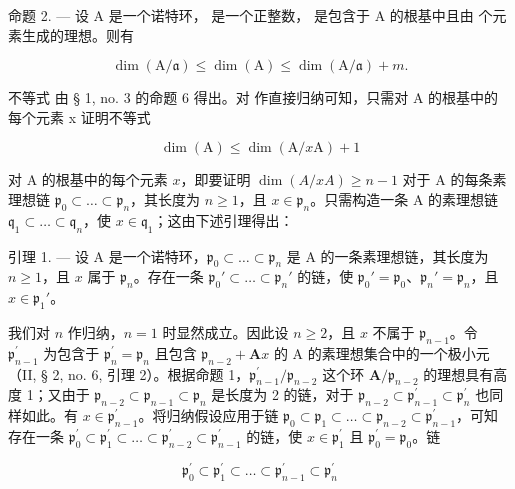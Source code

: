 命题 2. --- 设 A 是一个诺特环，  是一个正整数，  是包含于 A 的根基中且由  个元素生成的理想。则有

\[
\dim (\mathrm{A} / \mathfrak {a}) \leqslant \dim (\mathrm{A}) \leqslant \dim (\mathrm{A} / \mathfrak {a}) + m.\tag{4}
\]

不等式  由 § 1, no. 3 的命题 6 得出。对  作直接归纳可知，只需对 A 的根基中的每个元素 x 证明不等式

\[
\dim (\mathrm{A}) \leqslant \dim (\mathrm{A} / x \mathrm{A}) + 1\tag{5}
\]

对 A 的根基中的每个元素 \(x\)，即要证明 \(\dim(A/xA) \geqslant n - 1\) 对于 A 的每条素理想链 \(\mathfrak{p}_0 \subset \ldots \subset \mathfrak{p}_n\)，其长度为 \(n \geqslant 1\)，且 \(x \in \mathfrak{p}_n\)。只需构造一条 A 的素理想链 \(\mathfrak{q}_1 \subset \ldots \subset \mathfrak{q}_n\)，使 \(x \in \mathfrak{q}_1\)；这由下述引理得出：

引理 1. --- 设 A 是一个诺特环，\(\mathfrak{p}_{0} \subset \ldots \subset \mathfrak{p}_{n}\) 是 A 的一条素理想链，其长度为 \(n \geqslant 1\)，且 \(x\) 属于 \(\mathfrak{p}_{n}\)。存在一条 \(\mathfrak{p}_{0}' \subset \ldots \subset \mathfrak{p}_{n}'\) 的链，使 \(\mathfrak{p}_{0}' = \mathfrak{p}_{0}\)、\(\mathfrak{p}_{n}' = \mathfrak{p}_{n}\)，且 \(x \in \mathfrak{p}_{1}'\)。

我们对 \(n\) 作归纳，\(n=1\) 时显然成立。因此设 \(n\geqslant2\)，且 \(x\) 不属于 \(\mathfrak{p}_{n-1}\)。令 \(\mathfrak{p}_{n-1}^{\prime}\) 为包含于 \(\mathfrak{p}_{n}^{\prime}=\mathfrak{p}_{n}\) 且包含 \(\mathfrak{p}_{n-2}+\mathbf{A}x\) 的 A 的素理想集合中的一个极小元（II, § 2, no. 6, 引理 2）。根据命题 1，\(\mathfrak{p}_{n-1}^{\prime}/\mathfrak{p}_{n-2}\) 这个环 \(\mathbf{A}/\mathfrak{p}_{n-2}\) 的理想具有高度 1；又由于 \(\mathfrak{p}_{n-2}\subset\mathfrak{p}_{n-1}\subset\mathfrak{p}_{n}\) 是长度为 2 的链，对于 \(\mathfrak{p}_{n-2}\subset\mathfrak{p}_{n-1}^{\prime}\subset\mathfrak{p}_{n}^{\prime}\) 也同样如此。有 \(x\in\mathfrak{p}_{n-1}^{\prime}\)。将归纳假设应用于链 \(\mathfrak{p}_{0}\subset\mathfrak{p}_{1}\subset\ldots\subset\mathfrak{p}_{n-2}\subset\mathfrak{p}_{n-1}^{\prime}\)，可知存在一条 \(\mathfrak{p}_{0}^{\prime}\subset\mathfrak{p}_{1}^{\prime}\subset\ldots\subset\mathfrak{p}_{n-2}^{\prime}\subset\mathfrak{p}_{n-1}^{\prime}\) 的链，使 \(x\in\mathfrak{p}_{1}^{\prime}\) 且 \(\mathfrak{p}_{0}^{\prime}=\mathfrak{p}_{0}\)。链

\[
\mathfrak {p} _ {0} ^ {\prime} \subset \mathfrak {p} _ {1} ^ {\prime} \subset \dots \subset \mathfrak {p} _ {n - 1} ^ {\prime} \subset \mathfrak {p} _ {n} ^ {\prime}
\]

